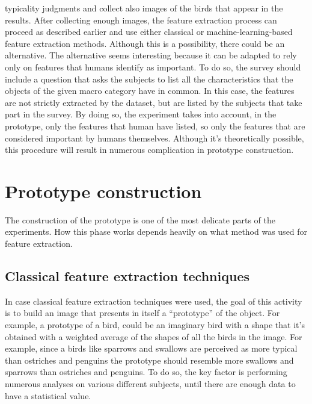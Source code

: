 \documentclass[conference]{IEEEtran}
\begin{document}
		typicality judgments and collect also images of the birds that appear in the results. After collecting enough images, the feature extraction process can proceed as described earlier and use either  
		classical or machine-learning-based feature extraction methods. Although this is a possibility, there could be an alternative. The alternative seems interesting because it can be adapted to rely only on features 
		that humans identify as important. To do so, the survey should include a question that asks the subjects to list all the characteristics that the objects of the given macro category have in common. In this case, 
		the features are not strictly extracted by the dataset, but are listed by the subjects that take part in the survey. By doing so, the experiment takes into account, in the prototype, only the features that 
		human have listed, so only the features that are considered important by humans themselves. Although it's theoretically possible, this procedure will result in numerous complication in prototype construction. 
		

	\section{Prototype construction}

		\noindent The construction of the prototype is one of the most delicate parts of the experiments. How this phase works depends heavily on what method was used for feature extraction. 
		
		\subsection{Classical feature extraction techniques}
		
			\noindent In case classical feature extraction techniques were used, the goal of this activity is to build an image that presents in itself a ``prototype'' of the object. For example, a prototype of a bird, could be 
			an imaginary bird with a shape that it's obtained with a weighted average of the shapes of all the birds in the image. For example, since a birds like sparrows and swallows are perceived as more 
			typical than ostriches and penguins the prototype should resemble more swallows and sparrows than ostriches and penguins. To do so, the key factor is performing numerous analyses on various 
			different subjects, until there are enough data to have a statistical value. 
			
\end{document}
